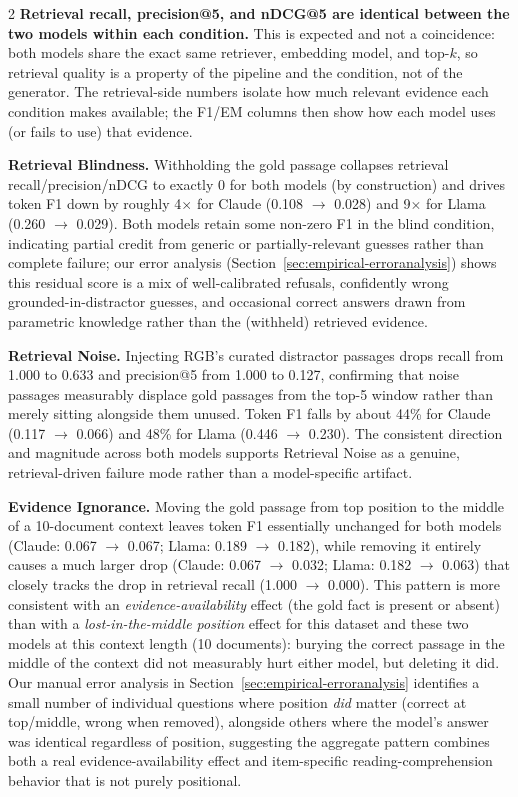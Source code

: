 \documentclass[11pt,a4paper]{article}
\begin{document}
\begin{multicols}{2}
\textbf{Retrieval recall, precision@5, and nDCG@5 are identical between the two models within each condition.} This is expected and not a coincidence: both models share the exact same retriever, embedding model, and top-$k$, so retrieval quality is a property of the pipeline and the condition, not of the generator. The retrieval-side numbers isolate how much relevant evidence each condition makes available; the F1/EM columns then show how each model uses (or fails to use) that evidence.

\textbf{Retrieval Blindness.} Withholding the gold passage collapses retrieval recall/precision/nDCG to exactly 0 for both models (by construction) and drives token F1 down by roughly 4$\times$ for Claude (0.108 $\rightarrow$ 0.028) and 9$\times$ for Llama (0.260 $\rightarrow$ 0.029). Both models retain some non-zero F1 in the blind condition, indicating partial credit from generic or partially-relevant guesses rather than complete failure; our error analysis (Section~\ref{sec:empirical-erroranalysis}) shows this residual score is a mix of well-calibrated refusals, confidently wrong grounded-in-distractor guesses, and occasional correct answers drawn from parametric knowledge rather than the (withheld) retrieved evidence.

\textbf{Retrieval Noise.} Injecting RGB's curated distractor passages drops recall from 1.000 to 0.633 and precision@5 from 1.000 to 0.127, confirming that noise passages measurably displace gold passages from the top-5 window rather than merely sitting alongside them unused. Token F1 falls by about 44\% for Claude (0.117 $\rightarrow$ 0.066) and 48\% for Llama (0.446 $\rightarrow$ 0.230). The consistent direction and magnitude across both models supports Retrieval Noise as a genuine, retrieval-driven failure mode rather than a model-specific artifact.

\textbf{Evidence Ignorance.} Moving the gold passage from top position to the middle of a 10-document context leaves token F1 essentially unchanged for both models (Claude: 0.067 $\rightarrow$ 0.067; Llama: 0.189 $\rightarrow$ 0.182), while removing it entirely causes a much larger drop (Claude: 0.067 $\rightarrow$ 0.032; Llama: 0.182 $\rightarrow$ 0.063) that closely tracks the drop in retrieval recall (1.000 $\rightarrow$ 0.000). This pattern is more consistent with an \textit{evidence-availability} effect (the gold fact is present or absent) than with a \textit{lost-in-the-middle position} effect for this dataset and these two models at this context length (10 documents): burying the correct passage in the middle of the context did not measurably hurt either model, but deleting it did. Our manual error analysis in Section~\ref{sec:empirical-erroranalysis} identifies a small number of individual questions where position \textit{did} matter (correct at top/middle, wrong when removed), alongside others where the model's answer was identical regardless of position, suggesting the aggregate pattern combines both a real evidence-availability effect and item-specific reading-comprehension behavior that is not purely positional.


\end{multicols}
\end{document}
